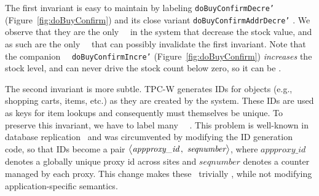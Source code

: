 The first invariant is easy to maintain by labeling {\tt doBuyConfirmDecre'} (Figure~\ref{fig:doBuyConfirm}) 
and its close variant {\tt doBuyConfirmAddrDecre'} \red. We observe that they are the only \shadow\ \operations\ in the system that
decrease the stock value, and as such are the only \shadow\ \operations\
that can possibly invalidate the first invariant.  Note that the
companion \shadow\ \operation\ {\tt doBuyCon\-firmIncre'} (Figure~\ref{fig:doBuyConfirm}) \emph{increases} the stock level, and can never drive the stock count below zero, so it can be \blue.

The second invariant is more subtle.  TPC-W generates IDs for
objects (e.g., shopping carts, items, etc.) as they are created by the
system. These IDs are used as keys for item lookups and consequently
must themselves be unique. To preserve this invariant, we have to label many \shadow\ \transactions\ \red.  %
This problem is well-known in database replication~\cite{Cecchet2008Middleware} and was circumvented
by modifying  the
ID generation code, so that IDs become a pair $\mytuple{appproxy\_id,seqnumber}$, where $appproxy\_id$ denotes
a globally unique proxy id across sites and $seqnumber$ denotes a counter managed by each proxy.
This change makes these \transactions\
trivially \blue, while not modifying application-specific semantics.






